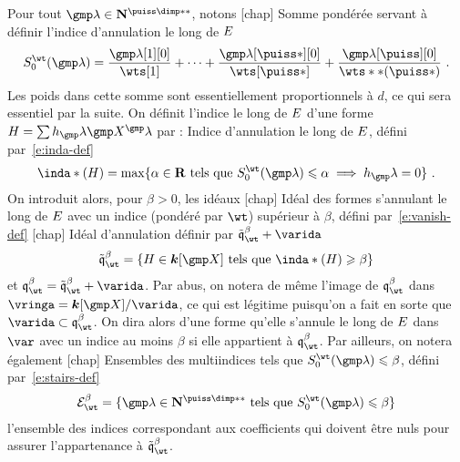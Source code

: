Pour tout \( \imp \in \N^{\puiss\dimp**} \), notons
\nomuse {\wtsum*} [chap] {Somme pondérée servant à définir l'indice
  d'annulation le long de \( E \)}
\begin{equation}
  \wtsum*( \imp )
  =
  \frac {\imp[1][0]} {\wts[1]} + \dots
  + \frac {\imp[\puiss*][0]} {\wts[\puiss*]}
  + \frac {\imp[\puiss][0]} {\wts**(\puiss*)}
  \pmm.
\end{equation}
Les poids dans cette somme sont essentiellement proportionnels à \( d \), ce
qui sera essentiel par la suite.
On définit l'indice le long de \( E \) d'une forme \( H = \sum h_\imp
  \vmp^\imp \) par :
\nomuse {\inda*} {Indice d'annulation le long de \( E \), défini
  par~\eqref{e:inda-def}}
\begin{equation} \label{e:inda-def}
  \inda*(H)
  =
  \max \set{
    \alpha \in \R
    \text{ tels que }
    \wtsum*(\imp) \le \alpha \implies h_\imp = 0
  }
  \pmm.
\end{equation}
On introduit alors, pour \( \beta > 0 \), les idéaux
\nomuse {\vanish[\beta]} [chap] {Idéal des formes s'annulant le long de \(
    E \) avec un indice (pondéré par \( \wt \)) supérieur à \( \beta \),
  défini par~\eqref{e:vanish-def}}
\nomuse {\vanish*[\beta]} [chap] {Idéal d'annulation définir par \(
    \vanish*[\beta] + \varida \)}
\begin{equation} \label{e:vanish-def}
  \vanish*[\beta]
  = \left\{
    H \in \cdn [\vmp]
    \text{ tels que }
    \inda*(H) \ge \beta
  \right\}
\end{equation}
et $\vanish[\beta] = \vanish*[\beta] + \varida$. Par abus, on notera de même
l'image de \( \vanish[\beta] \) dans $\vringa = \cdn [\vmp] / \varida$, ce
qui est légitime puisqu'on a fait en sorte que $\varida \subset
\vanish[\beta]$. On dira alors d'une forme qu'elle s'annule le long de \(
  E \) dans \( \var \) avec un indice au moins \( \beta \) si elle
appartient à \( \vanish[\beta] \).  Par ailleurs, on notera également
\nomuse {\stairs[\beta]} [chap] {Ensembles des multiindices tels que \(
    \wtsum*(\imp) \le \beta \), défini par~\eqref{e:stairs-def}}
\begin{equation} \label{e:stairs-def}
  \stairs[\beta] = \set{
    \imp \in \N^{\puiss\dimp**}
    \text{ tels que }
    \wtsum*(\imp) \le \beta
  }
\end{equation}
l'ensemble des indices correspondant aux coefficients qui doivent être nuls
pour assurer l'appartenance à \( \vanish*[\beta] \).

